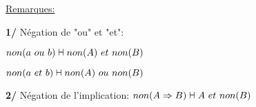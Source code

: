 \documentclass[12pt,twoside,a4paper]{article}
\newcommand{\vdashv}{\mathrel{\text{\ooalign{$\vdash$\cr$\dashv$\cr}}}}
\begin{document}
		\underline{Remarques:}
		\begin{liste}
			\item[\textbf{1/}] N\'egation de "ou" et "et":
				\begin{liste}
					\item $non(a\ ou\ b)\vdashv non(A)\ et\ non(B)$
					\item $non(a\ et\ b)\vdashv non(A)\ ou\ non(B)$
				\end{liste}
			\item[\textbf{2/}] N\'egation de l'implication:
				$non(A\Rightarrow B)\vdashv A\ et\ non(B)$
		\end{liste}
\end{document}
